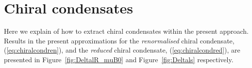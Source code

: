 \documentclass[%
reprint,
superscriptaddress,
showpacs,preprintnumbers,
 amsmath,amssymb,
 aps,
prd,
]{revtex4-1}
\def\Fig#1{Figure~\ref{#1}}
\def\eq#1{(\ref{#1})}
\begin{document}
\appendix
\begingroup
\allowdisplaybreaks



\section{Chiral condensates}\label{app:chiralcond}
Here we explain of how to extract chiral condensates within the
present approach. Results in the present approximations for the
\textit{renormalised} chiral condensate, \eq{eq:chiralcondren}, and
the \textit{reduced} chiral condensate, \eq{eq:chiralcondred}, are
presented in \Fig{fig:DeltalR_muB0} and \Fig{fig:Deltals} respectively.
\end{document}
